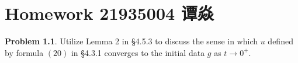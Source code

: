 \documentclass[a4paper]{book}
\makeatletter
\newenvironment{solution}%
{\noindent\textbf{Solution.}}%
{\qedhere}
\newcommand{\voidenvironment}[1]{%
  \expandafter\providecommand\csname env@#1@save@env\endcsname{}%
  \expandafter\providecommand\csname env@#1@process\endcsname{}%
  \@ifundefined{#1}{}{\RenewEnviron{#1}{}}%
}
\numberwithin{equation}{chapter}
\theoremstyle{definition}
\newtheorem{pro}[exm]{Problem}
\makeatother
\begin{document}
\pagestyle{empty}
% 



\setcounter{chapter}{11}




\chapter{Homework 21935004 谭焱}




  


\begin{pro}
  Utilize Lemma 2 in \S4.5.3 to discuss the sense in which $u$ defined by formula $(20)$ in \S4.3.1 converges to the initial data $g$ as $t \rightarrow 0^+$.
\end{pro}
\end{document}
